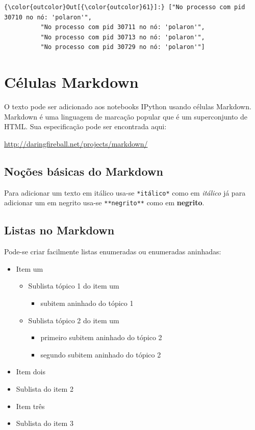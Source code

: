 \documentclass[11pt]{article}
\providecommand{\tightlist}{%
      \setlength{\itemsep}{0pt}\setlength{\parskip}{0pt}}
\begin{document}
\begin{Verbatim}[commandchars=\\\{\}]
{\color{outcolor}Out[{\color{outcolor}61}]:} ["No processo com pid 30710 no nó: 'polaron'",
          "No processo com pid 30711 no nó: 'polaron'",
          "No processo com pid 30713 no nó: 'polaron'",
          "No processo com pid 30729 no nó: 'polaron'"]
\end{Verbatim}
            
    \section{Células Markdown}\label{cuxe9lulas-markdown}

    O texto pode ser adicionado aos notebooks IPython usando células
Markdown. Markdown é uma linguagem de marcação popular que é um
superconjunto de HTML. Sua especificação pode ser encontrada aqui:

\url{http://daringfireball.net/projects/markdown/}

    \subsection{Noções básicas do
Markdown}\label{nouxe7uxf5es-buxe1sicas-do-markdown}

    Para adicionar um texto em itálico usa-se \texttt{*itálico*} como em
\emph{itálico} já para adicionar um em negrito usa-se
\texttt{**negrito**} como em \textbf{negrito}.

    \subsection{Listas no Markdown}\label{listas-no-markdown}

Pode-se criar facilmente listas enumeradas ou enumeradas aninhadas:

\begin{itemize}
\tightlist
\item
  Item um

  \begin{itemize}
  \tightlist
  \item
    Sublista tópico 1 do item um

    \begin{itemize}
    \tightlist
    \item
      subitem aninhado do tópico 1
    \end{itemize}
  \item
    Sublista tópico 2 do item um

    \begin{itemize}
    \tightlist
    \item
      primeiro subitem aninhado do tópico 2
    \item
      segundo subitem aninhado do tópico 2
    \end{itemize}
  \end{itemize}
\item
  Item dois
\item
  Sublista do item 2
\item
  Item três
\item
  Sublista do item 3
\end{itemize}
\end{document}
